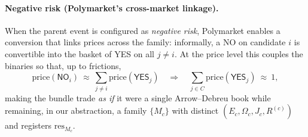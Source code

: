 \paragraph{Negative risk (Polymarket’s cross-market linkage).}
When the parent event is configured as \emph{negative risk}, Polymarket enables a conversion that links prices across the family:
informally, a \textsf{NO} on candidate $i$ is convertible into the basket of \textsf{YES} on all $j\neq i$.
At the price level this couples the binaries so that, up to frictions,
\[
\mathrm{price}(\textsf{NO}_i)\ \approx\ \sum_{j\neq i}\mathrm{price}(\textsf{YES}_j)
\quad\Longrightarrow\quad
\sum_{j\in C}\mathrm{price}(\textsf{YES}_j)\ \approx\ 1,
\]
making the bundle trade \emph{as if} it were a single Arrow--Debreu book while remaining, in our abstraction, a family $\{M_c\}$ with distinct $(E_c,\Omega_c,J_c,R^{(c)})$ and registers $\mathrm{res}_{M_c}$.
